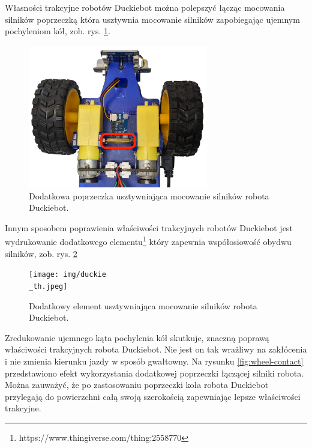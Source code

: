 \documentclass{svproc}
\begin{document}
Własności trakcyjne robotów Duckiebot można polepszyć łącząc mocowania silników poprzeczką która usztywnia mocowanie silników  zapobiegając ujemnym pochyleniom kół, zob. rys. \ref{fig:stiffening-crossbar}.

\begin{figure}[ht!]
    \centering
    \includegraphics[width=0.7\textwidth]{drive-upgrade.png}
    \caption{Dodatkowa poprzeczka usztywniająca mocowanie silników robota Duckiebot.}
    \label{fig:stiffening-crossbar}
\end{figure}

Innym sposobem poprawienia właściwości trakcyjnych robotów Duckiebot jest wydrukowanie dodatkowego elementu\footnote{https://www.thingiverse.com/thing:2558770} który zapewnia współosiowość obydwu silników, zob. rys. \ref{fig:stiffening-element}

\begin{figure}[ht!]
    \centering
    \texttt{[image: img/duckie\\\_th.jpeg]}
    \caption{Dodatkowy element usztywniająca mocowanie silników robota Duckiebot.}
    \label{fig:stiffening-element}
\end{figure}

Zredukowanie ujemnego kąta pochylenia kół skutkuje, znaczną poprawą właściwości trakcyjnych robota Duckiebot. Nie jest on tak wrażliwy na zakłócenia i nie zmienia kierunku jazdy w sposób gwałtowny. Na rysunku \ref{fig:wheel-contact} przedstawiono efekt wykorzystania dodatkowej poprzeczki łączącej silniki robota. Można zauważyć, że po zastosowaniu poprzeczki koła robota Duckiebot przylegają do powierzchni całą swoją szerokością zapewniając lepsze właściwości trakcyjne.
\end{document}
